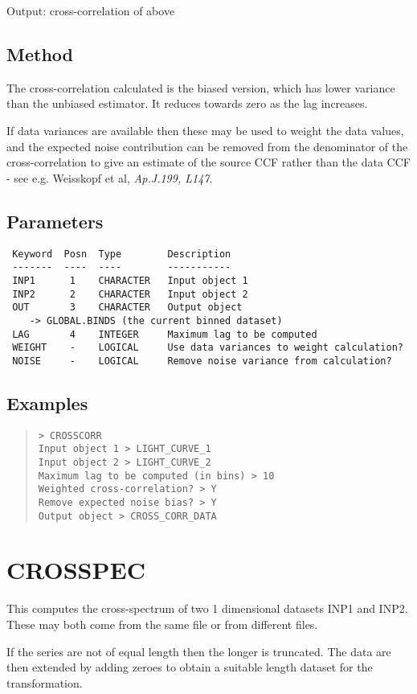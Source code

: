 \documentclass{book}
\renewcommand{\_}{{\tt\char'137}}     %
\begin{document}
Output: cross-correlation of above

\subsection{Method}
The cross-correlation calculated is the biased version, which has
lower variance than the unbiased estimator. It reduces towards
zero as the lag increases.

If data variances are available then these may be used to weight
the data values, and the expected noise contribution can be
removed from the denominator of the cross-correlation to give an
estimate of the source CCF rather than the data CCF - see e.g.
Weisskopf et al, {\em Ap.J.199, L147}.
\subsection{Parameters}
\begin{verbatim}
 Keyword  Posn  Type        Description
 -------  ----  ----        -----------
 INP1      1    CHARACTER   Input object 1
 INP2      2    CHARACTER   Input object 2
 OUT       3    CHARACTER   Output object
    -> GLOBAL.BINDS (the current binned dataset)
 LAG       4    INTEGER     Maximum lag to be computed
 WEIGHT    -    LOGICAL     Use data variances to weight calculation?
 NOISE     -    LOGICAL     Remove noise variance from calculation?

\end{verbatim}\subsection{Examples}
\begin{quote}\begin{verbatim}
> CROSSCORR
Input object 1 > LIGHT_CURVE_1
Input object 2 > LIGHT_CURVE_2
Maximum lag to be computed (in bins) > 10
Weighted cross-correlation? > Y
Remove expected noise bias? > Y
Output object > CROSS_CORR_DATA
\end{verbatim}\end{quote}
\section{CROSSPEC}
This computes the cross-spectrum of two 1 dimensional datasets
INP1 and INP2. These may both come from the same file or from
different files.

If the series are not of equal length then the longer is
truncated. The data are then extended by adding zeroes to obtain
a suitable length dataset for the transformation.
\end{document}
